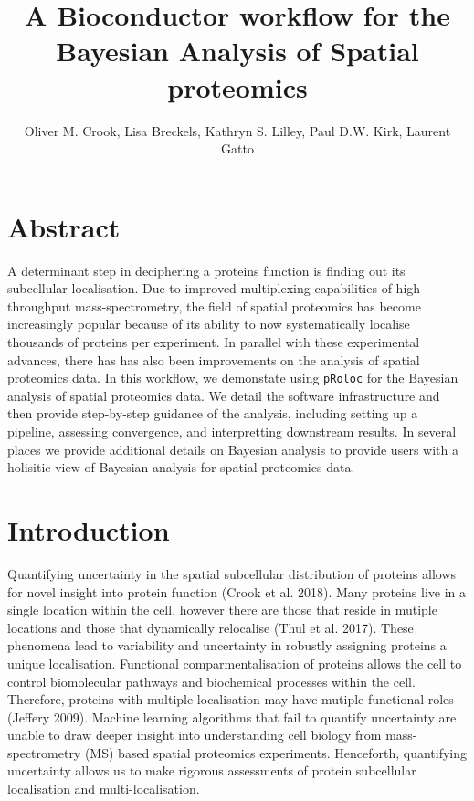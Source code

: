 \documentclass[]{article}
\title{A Bioconductor workflow for the Bayesian Analysis of Spatial proteomics}
\author{Oliver M. Crook, Lisa Breckels, Kathryn S. Lilley, Paul D.W. Kirk,
Laurent Gatto}
\date{}
\begin{document}
\maketitle

\newcommand{\diag}{\mathop{\mathrm{diag}}}

\section*{Abstract}\label{abstract}

A determinant step in deciphering a proteins function is finding out its
subcellular localisation. Due to improved multiplexing capabilities of
high-throughput mass-spectrometry, the field of spatial proteomics has
become increasingly popular because of its ability to now systematically
localise thousands of proteins per experiment. In parallel with these
experimental advances, there has has also been improvements on the
analysis of spatial proteomics data. In this workflow, we demonstate
using \texttt{pRoloc} for the Bayesian analysis of spatial proteomics
data. We detail the software infrastructure and then provide
step-by-step guidance of the analysis, including setting up a pipeline,
assessing convergence, and interpretting downstream results. In several
places we provide additional details on Bayesian analysis to provide
users with a holisitic view of Bayesian analysis for spatial proteomics
data.

\section{Introduction}\label{introduction}

Quantifying uncertainty in the spatial subcellular distribution of
proteins allows for novel insight into protein function (Crook et al.
2018). Many proteins live in a single location within the cell, however
there are those that reside in mutiple locations and those that
dynamically relocalise (Thul et al. 2017). These phenomena lead to
variability and uncertainty in robustly assigning proteins a unique
localisation. Functional comparmentalisation of proteins allows the cell
to control biomolecular pathways and biochemical processes within the
cell. Therefore, proteins with multiple localisation may have mutiple
functional roles (Jeffery 2009). Machine learning algorithms that fail
to quantify uncertainty are unable to draw deeper insight into
understanding cell biology from mass-spectrometry (MS) based spatial
proteomics experiments. Henceforth, quantifying uncertainty allows us to
make rigorous assessments of protein subcellular localisation and
multi-localisation.
\end{document}
